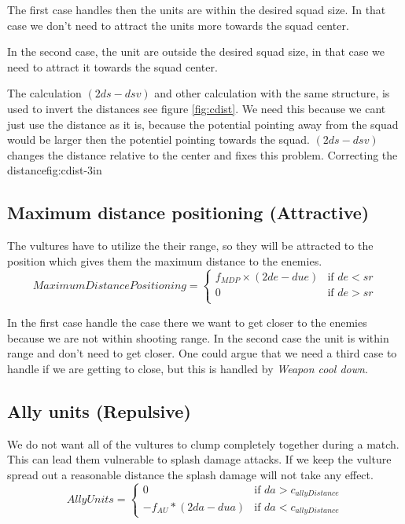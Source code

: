 	    The first case handles then the units are within the desired squad size. In that case we don't need to attract the units more towards the squad center.
	    
	    In the second case, the unit are outside the desired squad size, in that case we need to attract it towards the squad center.

        The calculation $(2ds - dsv)$ and other calculation with the same structure, is used to invert the distances see figure \ref{fig:cdist}. We need this because we cant just use the distance as it is, because the potential pointing away from the squad would be larger then the potentiel pointing towards the squad. $(2ds - dsv)$ changes the distance relative to the center and fixes this problem.    
		    {Correcting the distance}{fig:cdist}{-3in}
	\subsection*{Maximum distance positioning (Attractive)}
		The vultures have to utilize the their range, so they will be attracted to the position which gives them the maximum distance to the enemies.
		\begin{displaymath}
			MaximumDistancePositioning = \begin{cases}
					f_{MDP} \times (2de - due) & \text{if } de < sr\\
					0 & \text{if } de > sr\\
				\end{cases}		
		\end{displaymath}
		
		In the first case handle the case there we want to get closer to the enemies because we are not within shooting range.
		In the second case the unit is within range and don't need to get closer. One could argue that we need a third case to handle if we are getting to close, but this is handled by \textit{Weapon cool down}.
		
	\subsection*{Ally units (Repulsive)}
We do not want all of the vultures to clump completely together during a match. This can lead them vulnerable to splash damage attacks. If we keep the vulture spread out a reasonable distance the splash damage will not take any effect.
		\begin{displaymath}
			AllyUnits = \begin{cases}
					0 & \text{if } da > c_{allyDistance}\\
					-f_{AU} * (2da - dua) & \text{if } da < c_{allyDistance}
				\end{cases}		
		\end{displaymath}
	
